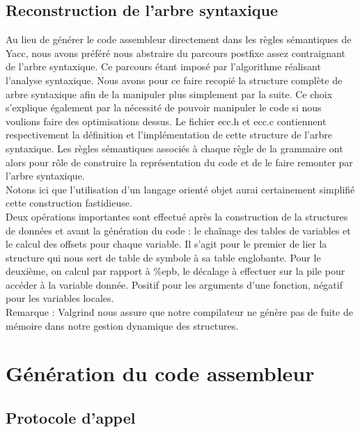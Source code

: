 \documentclass[a4paper, 11pt]{article}
\begin{document}
\subsection{Reconstruction de l'arbre syntaxique}

Au lieu de générer le code assembleur directement dans les règles sémantiques de Yacc, nous avons préféré nous abstraire du parcours 
postfixe assez contraignant de l'arbre syntaxique. Ce parcours étant imposé par l'algorithme réalisant l'analyse syntaxique. Nous avons
pour ce faire recopié la structure complète de arbre syntaxique afin de la manipuler plus simplement par la suite. Ce choix s'explique 
également par la nécessité de pouvoir manipuler le code si nous voulions faire des optimisations dessus.
Le fichier ecc.h et ecc.c contiennent respectivement la définition et l'implémentation de cette structure de l'arbre syntaxique.
Les règles sémantiques associés à chaque règle de la grammaire ont alors pour rôle de construire la représentation du code et de le faire
remonter par l'arbre syntaxique.\\

Notons ici que l'utilisation d'un langage orienté objet aurai certainement simplifié cette construction fastidieuse.\\

Deux opérations importantes sont effectué après la construction de la structures de données et avant la génération du code : 
le cha\^inage des tables de variables et le calcul des offsets pour chaque variable.
Il s'agit pour le premier de lier la structure qui nous sert de table de symbole à sa table englobante.
Pour le deuxième, on calcul par rapport à \%epb, le décalage à effectuer sur la pile pour accéder à la variable donnée. Positif 
pour les arguments d'une fonction, négatif pour les variables locales.\\

Remarque : Valgrind nous assure que notre compilateur ne génère pas de fuite de mémoire dans notre gestion dynamique des structures.

\section{Génération du code assembleur}

\subsection{Protocole d'appel}
\end{document}
